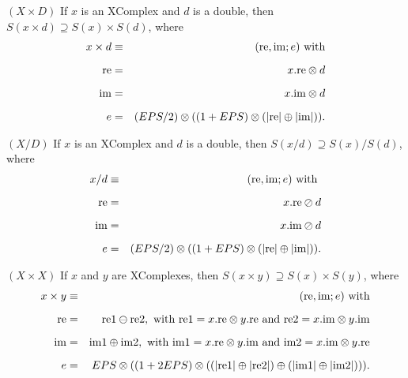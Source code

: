 \begin{proposition}\label{GMT prop7.8}{$(X  \times  D)$} 
If $x$ is an {\textrm XComplex} and $d$ is a double{\textrm ,} then 
$S(x \times d) \supseteq S(x) \times S(d)${\textrm ,} where
\begin{eqnarray*}
x \times d &\equiv& (\mathrm {re},\mathrm {im};e) \hbox{ with}\\[6pt] \mathrm {re} &= &x.\mathrm {re} \otimes d\\[6pt] \mathrm {im} &= &x.\mathrm {im} \otimes d\\[6pt] e &=& (EPS/2) \otimes ((1 + EPS) \otimes (|\mathrm {re}| \oplus |\mathrm {im}|) ). \end{eqnarray*}
\end{proposition}

\begin{proposition}\label{GMT prop7.9}{$(X / D)$} 
If $x$ is an {\textrm XComplex} and $d$ is a double{\textrm ,} then 
$S(x / d) \supseteq S(x) / S(d)${\textrm ,} where
\begin{eqnarray*}
x / d& \equiv& (\mathrm {re},\mathrm {im};e) \hbox{ with }\\[6pt] \mathrm {re}& =& x.\mathrm {re} \oslash d\\[6pt] \mathrm {im} &= &x.\mathrm {im} \oslash d\\[6pt] e& = &(EPS/2) \otimes ((1 + EPS) \otimes (|\mathrm {re}| \oplus |\mathrm {im}|) ).
\end{eqnarray*}
\end{proposition}

\begin{proposition}\label{GMT prop7.10}{$(X  \times  X)$}
If $x$ and $y$ are {\textrm XComplexes,} then 
$S(x \times y) \supseteq S(x) \times S(y)${\textrm ,} where
\begin{eqnarray*}
x \times y &\equiv& (\mathrm {re},\mathrm {im};e)\hbox{ with}\\[6pt] \mathrm {re}& =&\mathrm {re}1 \ominus \mathrm {re2}, \hbox{ with $\mathrm {re1} = x.\mathrm {re} \otimes y.\mathrm {re}$ and $\mathrm {re}2 =
x.\mathrm {im} \otimes y.\mathrm {im}$} \\[6pt] \mathrm {im}& =& \mathrm {im}1 \oplus \mathrm {im}2, \hbox{ with $\mathrm {im}1 = x.\mathrm {re} \otimes y.\mathrm {im}$ and $\mathrm {im}2 = x.\mathrm {im} \otimes
y.\mathrm {re}$}\\[6pt] e& =& EPS \otimes ((1 + 2EPS) \otimes  ((|\mathrm {re}1| \oplus |\mathrm {re}2|) \oplus  (|\mathrm {im}1| \oplus |\mathrm {im}2|))).
\end{eqnarray*}
\end{proposition}

